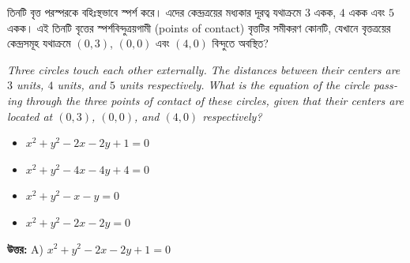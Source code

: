 \documentclass[12pt, a4paper]{article}
\begin{document}
\begin{tcolorbox}[questionbox={প্রশ্ন (Question) 24}]
    \noindent
    তিনটি বৃত্ত পরস্পরকে বহিঃস্থভাবে স্পর্শ করে। এদের কেন্দ্রত্রয়ের মধ্যকার দূরত্ব যথাক্রমে $3$ একক, $4$ একক এবং $5$ একক। এই তিনটি বৃত্তের স্পর্শবিন্দুত্রয়গামী (points of contact) বৃত্তটির সমীকরণ কোনটি, যেখানে বৃত্তত্রয়ের কেন্দ্রসমূহ যথাক্রমে $(0, 3)$, $(0, 0)$ এবং $(4, 0)$ বিন্দুতে অবস্থিত?
    
    \vspace{0.8em}
    \begin{english}
    \noindent\textit{\color{darkgray}
    Three circles touch each other externally. The distances between their centers are $3$ units, $4$ units, and $5$ units respectively. What is the equation of the circle passing through the three points of contact of these circles, given that their centers are located at $(0, 3)$, $(0, 0)$, and $(4, 0)$ respectively?
    }
    \end{english}
\end{tcolorbox}

\begin{itemize}[label={}, leftmargin=1cm, itemsep=0.5em]
    \item[\textbf{A)}] $x^2 + y^2 - 2x - 2y + 1 = 0$
    \item[\textbf{B)}] $x^2 + y^2 - 4x - 4y + 4 = 0$
    \item[\textbf{C)}] $x^2 + y^2 - x - y = 0$
    \item[\textbf{D)}] $x^2 + y^2 - 2x - 2y = 0$
\end{itemize}

\vspace{0.5em}
\begin{tcolorbox}[answerbox]
    \textbf{\color{success} উত্তর:} A) $x^2 + y^2 - 2x - 2y + 1 = 0$
\end{tcolorbox}
\vspace{1em}
\end{document}
